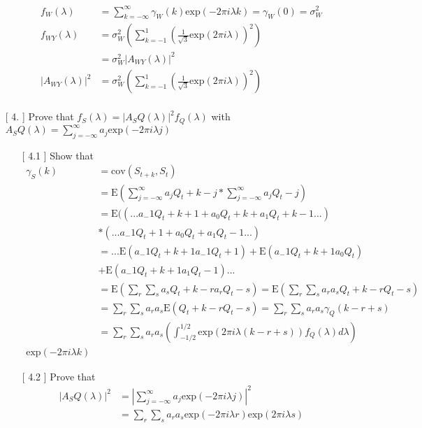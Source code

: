 \documentclass[10pt,a4paper]{article}
\begin{document}
\begin{enumerate}
\begin{enumerate}
		\begin{align*}
			f_W(\lambda) &= \sum_{k=-\infty}^{\infty} \gamma_{W}(k) \text{exp}(-2\pi i \lambda k) = \gamma_{W}(0) = \sigma_{W}^2\\
			f_{WY}(\lambda) &= \sigma_{W}^2 \left( \sum_{k=-1}^{1}(\frac{1}{\sqrt{3}}\text{exp}(2\pi i \lambda))^2\right) \\
			&= \sigma_{W}^2 |A_{WY}(\lambda)|^2 \\
			|A_{WY}(\lambda)|^2 &= \sigma_{W}^2 \left( \sum_{k=-1}^{1}(\frac{1}{\sqrt{3}}\text{exp}(2\pi i \lambda))^2\right) \\
		\end{align*}
		\end{enumerate}
	\item[[ 4.]] Prove that $f_S(\lambda) = |A_SQ(\lambda)|^2 f_Q(\lambda)$ with $A_SQ(\lambda) = \sum_{j=-\infty}^{\infty}a_j \text{exp}(-2\pi i \lambda j)$
		\begin{enumerate}
		\item[[ 4.1]] Show that 
		\begin{align*}
			\gamma_{S}(k) &= \text{cov}(S_{t+k},S_t) \\
			&= \text{E}(\sum_{j=-\infty}^{\infty}a_j Q_t+k-j * \sum_{j=-\infty}^{\infty}a_j Q_t-j ) \\
			&= \text{E}((...a_-1 Q_t+k+1 + a_0 Q_t+k + a_1 Q_t+k-1 ...) \\
			&*(...a_-1 Q_t+1 + a_0 Q_t + a_1 Q_t-1 ...) \\
			&= ... \text{E}(a_-1 Q_t+k+1 a_-1 Q_t+1) + \text{E}(a_-1 Q_t+k+1 a_0 Q_t) \\
			&+ \text{E}(a_-1 Q_t+k+1 a_1 Q_t-1)... \\
			&= \text{E}(\sum_{r} \sum_{s} a_s Q_t+k-r a_r Q_t-s) = \text{E}(\sum_{r} \sum_{s} a_r a_s Q_t+k-r Q_t-s) \\
			&= \sum_{r} \sum_{s} a_r a_s \text{E}(Q_t+k-r Q_t-s) = \sum_{r} \sum_{s} a_r a_s \gamma_Q (k-r+s) \\
			&= \sum_{r} \sum_{s} a_r a_s (\int_{-1/2}^{1/2} \text{exp}(2\pi i \lambda (k-r+s)) f_Q(\lambda) d\lambda ) \\
			\text{exp}(-2\pi i \lambda k)
		\end{align*}
		\item[[ 4.2]] Prove that
		\begin{align*}
			|A_SQ(\lambda)|^2 &= |\sum_{j=-\infty}^{\infty}a_j \text{exp}(-2\pi i \lambda j)|^2 \\
			&= \sum_{r} \sum_{s} a_r a_s  \text{exp}(-2\pi i \lambda r) \text{exp}(2\pi i \lambda s) \\

\end{align*}
\end{enumerate}
\end{enumerate}
\end{document}
